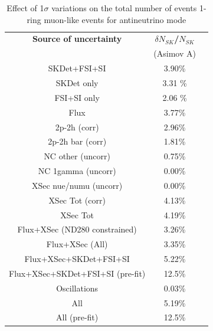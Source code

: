 \begin{table}[htb]
\centering
\begin{tabular}{| c | c | c |}
\hline
  {\bf Source of uncertainty}    & \multicolumn{1}{c|}{{\bf ${\delta}N_{SK}$/$N_{SK}$}}\\
                                 & \multicolumn{1}{c|}{(Asimov A)}\\

\hline
\hline  
SKDet+FSI+SI                   & 3.90\%                        \\
SKDet only                   & 3.31 \%                        \\
FSI+SI only                   & 2.06 \%                        \\
\hline
  Flux                           & 3.77\%                        \\
\hline
\hline
  2p-2h (corr)                     & 2.96\%                        \\
  2p-2h bar (corr)                  & 1.81\%                        \\
  NC other (uncorr)              & 0.75\%                        \\
  NC 1gamma (uncorr)             & 0.00\%                        \\
  XSec nue/numu (uncorr)                 & 0.00\%                        \\
\hline
  XSec Tot (corr)                  & 4.13\%                        \\
  XSec Tot                       & 4.19\%                        \\
\hline
\hline
  Flux+XSec (ND280 constrained)                      & 3.26\%                        \\
  Flux+XSec  (All)                    & 3.35\%                        \\
\hline
  Flux+XSec+SKDet+FSI+SI         & 5.22\%                        \\
  Flux+XSec+SKDet+FSI+SI (pre-fit)         & 12.5\%                        \\
\hline
\hline
  Oscillations                   & 0.03\%                        \\
\hline
\hline
  All                            & 5.19\%                        \\
  All (pre-fit) 		& 12.5\%				\\
\hline
\hline
\end{tabular} 
\caption{
 Effect of 1$\sigma$ variations on the total number of events 1-ring muon-like events for antineutrino mode
}
\end{table}
